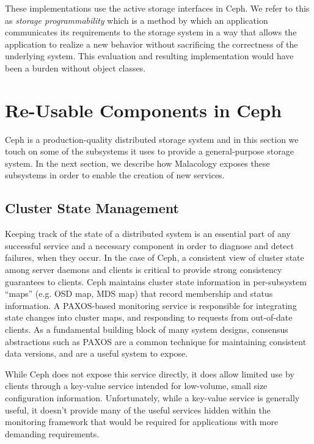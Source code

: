 \documentclass[10pt,twocolumn]{article}
\begin{document}
These implementations use the active storage interfaces in Ceph. We
refer to this as \emph{storage programmability} which is a method by
which an application communicates its requirements to the storage system
in a way that allows the application to realize a new behavior without
sacrificing the correctness of the underlying system. This evaluation
and resulting implementation would have been a burden without object
classes.
\fi

\section{Re-Usable Components in Ceph}\label{re-usable-components-in-ceph}

\label{background}

Ceph is a production-quality distributed storage system and in this section we
touch on some of the subsystems it uses to provide a general-purpose
storage system. In the next section, we describe how Malacology exposes these
subsystems in order to enable the creation of new services.

\subsection{Cluster State Management}
\label{consistencyversioning-of-cluster-state}

Keeping track of the state of a distributed system is an essential part of any 
successful service and a necessary component in order to diagnose and detect 
failures, when they occur. In the case of Ceph, a consistent view of cluster 
state among server daemons and clients is critical
to provide strong consistency guarantees to clients. Ceph maintains cluster
state information in per-subsystem ``maps'' (e.g. OSD map, MDS map) that
record membership and status information. A PAXOS-based monitoring service is
responsible for integrating state changes into cluster maps, and responding to
requests from out-of-date clients. As a fundamental building block of many
system designs, consensus abstractions such as PAXOS are a common technique
for maintaining consistent data versions, and are a useful system to expose.

While Ceph does not expose this service directly, it does allow limited use by
clients through a key-value service intended for low-volume, small size
configuration information. Unfortunately, while a key-value service is
generally useful, it doesn't provide many of the useful services hidden within
the monitoring framework that would be required for applications with more
demanding requirements.
\end{document}
